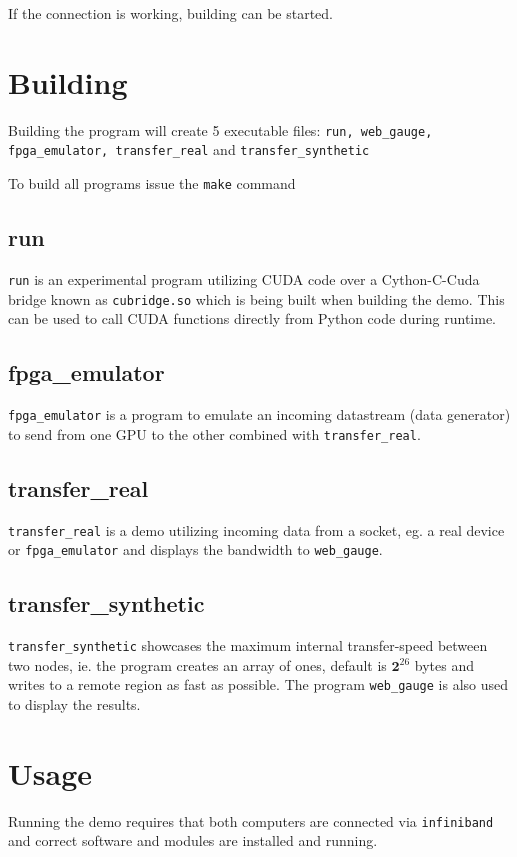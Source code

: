 \documentclass[a4paper,onecolumn]{article}
\begin{document}
If the connection is working, building can be started.
\pagebreak

\section{Building}
Building the program will create 5 executable files: \verb|run, web_gauge, fpga_emulator, transfer_real| and \verb|transfer_synthetic|

\vspace{5mm} %
To build all programs issue the \verb|make| command

\subsection{run}
\verb|run| is an experimental program utilizing CUDA code over a Cython-C-Cuda bridge known as \verb|cubridge.so| which is being built when building the demo. This can be used to call CUDA functions directly from Python code during runtime.

\subsection{fpga\_emulator}
\verb|fpga_emulator| is a program to emulate an incoming datastream (data generator) to send from one GPU to the other combined with \verb|transfer_real|.

\subsection{transfer\_real}
\verb|transfer_real| is a demo utilizing incoming data from a socket, eg. a real device or \verb|fpga_emulator| and displays the bandwidth to \verb|web_gauge|.

\subsection{transfer\_synthetic}
\verb|transfer_synthetic| showcases the maximum internal transfer-speed between two nodes, ie. the program creates an array of ones, default is $\bm{2}^{26}$ bytes and writes to a remote region as fast as possible. The program \verb|web_gauge| is also used to display the results.


\section{Usage}
Running the demo requires that both computers are connected via \verb|infiniband| and correct software and modules are installed and running.
\end{document}
